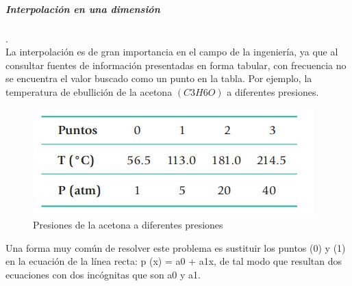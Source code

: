 \documentclass[12pt,letterpaper]{article}
\begin{document}
\subparagraph{Interpolación en una dimensión}
.\\
La interpolación es de gran importancia en el campo de la ingeniería, ya que al consultar fuentes de
información presentadas en forma tabular, con frecuencia no se encuentra el valor buscado como un
punto en la tabla. Por ejemplo, la temperatura de ebullición de la acetona $(C3H6O)$ a diferentes presiones.
\begin{figure}[hbtp]
\centering
\includegraphics[scale=1]{imagenes/presiones.JPG}
\caption{Presiones de la acetona a diferentes presiones}
\end{figure}
Una forma muy común de resolver este problema es sustituir los puntos (0) y (1) en la ecuación
de la línea recta: p (x) = a0 + a1x, de tal modo que resultan dos ecuaciones con dos incógnitas que son
a0 y a1. \\
\end{document}
